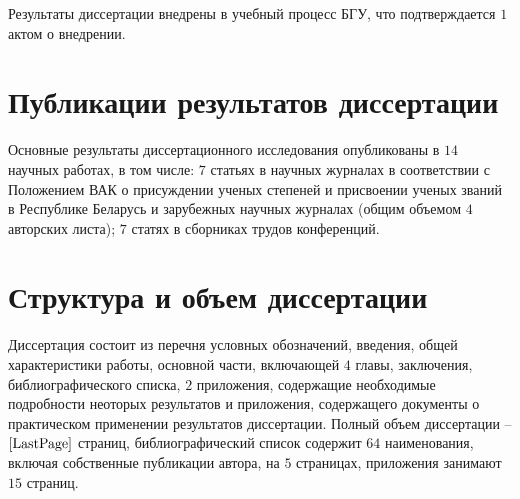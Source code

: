 \documentclass[_00_dissertation.tex]{subfiles}
\begin{document}
Результаты диссертации внедрены в учебный процесс БГУ, что подтверждается $1$ актом о внедрении.

\section*{Публикации результатов диссертации}

Основные результаты диссертационного исследования опубликованы в $14$ научных работах, в том числе: $7$ статьях в научных журналах в соответствии с Положением ВАК о присуждении ученых степеней и присвоении ученых званий в Республике Беларусь и зарубежных научных журналах (общим объемом $4$ авторских листа); $7$ статях в сборниках трудов конференций.

\section*{Структура и объем диссертации}

Диссертация состоит из перечня условных обозначений, введения, общей характеристики работы, основной части, включающей $4$ главы, заключения, библиографического списка, $2$ приложения, содержащие необходимые подробности неоторых результатов и приложения, содержащего документы о практическом применении результатов диссертации.
Полный объем диссертации -- $\pageref{LastPage}$ страниц, библиографический список содержит $64$ наименования, включая собственные публикации автора, на $5$ страницах, приложения занимают $15$ страниц.

\onlyinsubfile{
    
}
\end{document}
